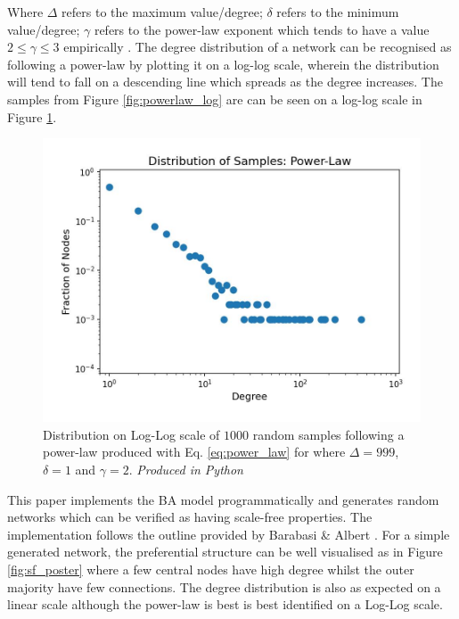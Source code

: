 \documentclass[
	a4paper, %
	10pt, %
	unnumberedsections, %
	twoside, %
]{LTJournalArticle}
\begin{document}
Where \(\Delta\) refers to the maximum value/degree; \(\delta\) refers to the minimum value/degree; \(\gamma\) refers to the power-law exponent which tends to have a value \(2 \leq \gamma \leq 3\) empirically \cite{albert:02}. The degree distribution of a network can be recognised as following a power-law by plotting it on a log-log scale, wherein the distribution will tend to fall on a descending line which spreads as the degree increases. The samples from Figure \ref{fig:powerlaw_log} are can be seen on a log-log scale in Figure \ref{fig:powerlaw_loglog}. 

\begin{figure} %
	\includegraphics[width=\linewidth]{Figures/ba/power_law_dist_loglog.jpg}
	\caption{Distribution on Log-Log scale of \(1000\) random samples following a power-law produced with Eq. \ref{eq:power_law} for where \(\Delta = 999\), \(\delta = 1\) and \(\gamma = 2\). \emph{Produced in Python}}
	\label{fig:powerlaw_loglog}
\end{figure}

This paper implements the BA model programmatically and generates random networks which can be verified as having scale-free properties. The implementation follows the outline provided by Barabasi \& Albert \cite{albert:99}. For a simple generated network, the preferential structure can be well visualised as in Figure \ref{fig:sf_poster} where a few central nodes have high degree whilst the outer majority have few connections. The degree distribution is also as expected on a linear scale although the power-law is best is best identified on a Log-Log scale. \\
\end{document}
